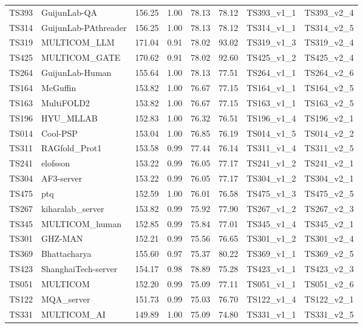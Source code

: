 \begin{longtable}{llllllll}
TS393 & GuijunLab-QA & 156.25 & 1.00 & 78.13 & 78.12 & TS393\_v1\_1 & TS393\_v2\_4 \\ 
TS314 & GuijunLab-PAthreader & 156.25 & 1.00 & 78.13 & 78.12 & TS314\_v1\_1 & TS314\_v2\_5 \\ 
TS319 & MULTICOM\_LLM & 171.04 & 0.91 & 78.02 & 93.02 & TS319\_v1\_3 & TS319\_v2\_4 \\ 
TS425 & MULTICOM\_GATE & 170.62 & 0.91 & 78.02 & 92.60 & TS425\_v1\_2 & TS425\_v2\_4 \\ 
TS264 & GuijunLab-Human & 155.64 & 1.00 & 78.13 & 77.51 & TS264\_v1\_1 & TS264\_v2\_6 \\ 
TS164 & McGuffin & 153.82 & 1.00 & 76.67 & 77.15 & TS164\_v1\_1 & TS164\_v2\_5 \\ 
TS163 & MultiFOLD2 & 153.82 & 1.00 & 76.67 & 77.15 & TS163\_v1\_1 & TS163\_v2\_5 \\ 
TS196 & HYU\_MLLAB & 152.83 & 1.00 & 76.32 & 76.51 & TS196\_v1\_4 & TS196\_v2\_1 \\ 
TS014 & Cool-PSP & 153.04 & 1.00 & 76.85 & 76.19 & TS014\_v1\_5 & TS014\_v2\_2 \\ 
TS311 & RAGfold\_Prot1 & 153.58 & 0.99 & 77.44 & 76.14 & TS311\_v1\_4 & TS311\_v2\_5 \\ 
TS241 & elofsson & 153.22 & 0.99 & 76.05 & 77.17 & TS241\_v1\_2 & TS241\_v2\_1 \\ 
TS304 & AF3-server & 153.22 & 0.99 & 76.05 & 77.17 & TS304\_v1\_2 & TS304\_v2\_1 \\ 
TS475 & ptq & 152.59 & 1.00 & 76.01 & 76.58 & TS475\_v1\_3 & TS475\_v2\_5 \\ 
TS267 & kiharalab\_server & 153.82 & 0.99 & 75.92 & 77.90 & TS267\_v1\_2 & TS267\_v2\_3 \\ 
TS345 & MULTICOM\_human & 152.85 & 0.99 & 75.84 & 77.01 & TS345\_v1\_4 & TS345\_v2\_1 \\ 
TS301 & GHZ-MAN & 152.21 & 0.99 & 75.56 & 76.65 & TS301\_v1\_2 & TS301\_v2\_4 \\ 
TS369 & Bhattacharya & 155.60 & 0.97 & 75.37 & 80.22 & TS369\_v1\_1 & TS369\_v2\_5 \\ 
TS423 & ShanghaiTech-server & 154.17 & 0.98 & 78.89 & 75.28 & TS423\_v1\_1 & TS423\_v2\_3 \\ 
TS051 & MULTICOM & 152.20 & 0.99 & 75.09 & 77.11 & TS051\_v1\_1 & TS051\_v2\_6 \\ 
TS122 & MQA\_server & 151.73 & 0.99 & 75.03 & 76.70 & TS122\_v1\_4 & TS122\_v2\_1 \\ 
TS331 & MULTICOM\_AI & 149.89 & 1.00 & 75.09 & 74.80 & TS331\_v1\_1 & TS331\_v2\_5 \\ 

\end{longtable}
